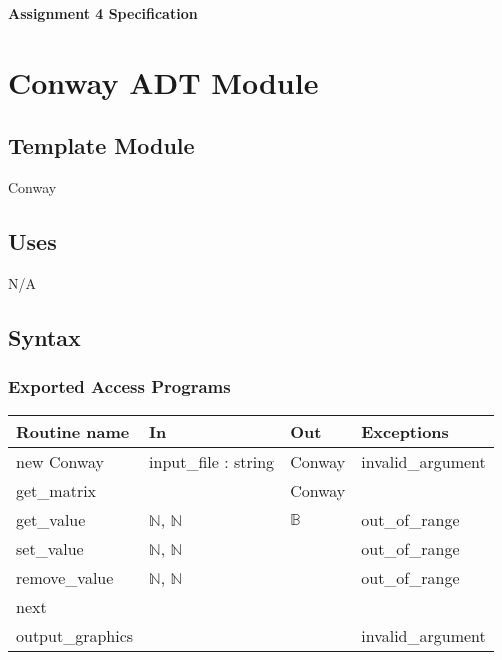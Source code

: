 \documentclass[12pt]{article}
\begin{document}
\begin{titlepage}
   \begin{center}
      \Large\textbf{Assignment 4 Specification}\\
      \large{}
   \end{center}
\end{titlepage}

\newpage

\section* {Conway ADT Module}

\subsection* {Template Module}

Conway

\subsection* {Uses}

N/A

\subsection* {Syntax}

\subsubsection* {Exported Access Programs}





\begin{tabular}{| l | l | l | p{5cm} |}
\hline
\textbf{Routine name} & \textbf{In} & \textbf{Out} & \textbf{Exceptions}\\
\hline
new Conway & input\_file : string & Conway & invalid\_argument\\
\hline
get\_matrix &  & Conway &  \\
\hline
get\_value & $\mathbb{N}$, $\mathbb{N}$ & $\mathbb{B}$ & out\_of\_range\\
\hline
set\_value & $\mathbb{N}$, $\mathbb{N}$ &  & out\_of\_range\\
\hline
remove\_value & $\mathbb{N}$, $\mathbb{N}$ &  & out\_of\_range\\
\hline
next& &  & \\
\hline
output\_graphics & & & invalid\_argument\\
\hline
\end{tabular}
\end{document}
